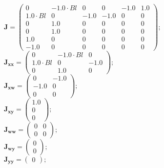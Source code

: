 \documentclass[11pt, oneside]{article}      %
\begin{document}
%
$ \mathbf{J} = \left(\begin{array}{cccccc}0 & - 1.0 \cdot Bl & 0 & 0 & -1.0 & 1.0\\1.0 \cdot Bl & 0 & -1.0 & -1.0 & 0 & 0\\0 & 1.0 & 0 & 0 & 0 & 0\\0 & 1.0 & 0 & 0 & 0 & 0\\1.0 & 0 & 0 & 0 & 0 & 0\\-1.0 & 0 & 0 & 0 & 0 & 0\end{array}\right) ; $ 
%
\\
%
$ \mathbf{J_{xx}} = \left(\begin{array}{ccc}0 & - 1.0 \cdot Bl & 0\\1.0 \cdot Bl & 0 & -1.0\\0 & 1.0 & 0\end{array}\right) ; $ 
%
\\
%
$ \mathbf{J_{xw}} = \left(\begin{array}{cc}0 & -1.0\\-1.0 & 0\\0 & 0\end{array}\right) ; $ 
%
\\
%
$ \mathbf{J_{xy}} = \left(\begin{array}{c}1.0\\0\\0\end{array}\right) ; $ 
%
\\
%
$ \mathbf{J_{ww}} = \left(\begin{array}{cc}0 & 0\\0 & 0\end{array}\right) ; $ 
%
\\
%
$ \mathbf{J_{wy}} = \left(\begin{array}{c}0\\0\end{array}\right) ; $ 
%
\\
%
$ \mathbf{J_{yy}} = \left(\begin{array}{c}0\end{array}\right) ; $ 
%
\\
%
\end{document}
